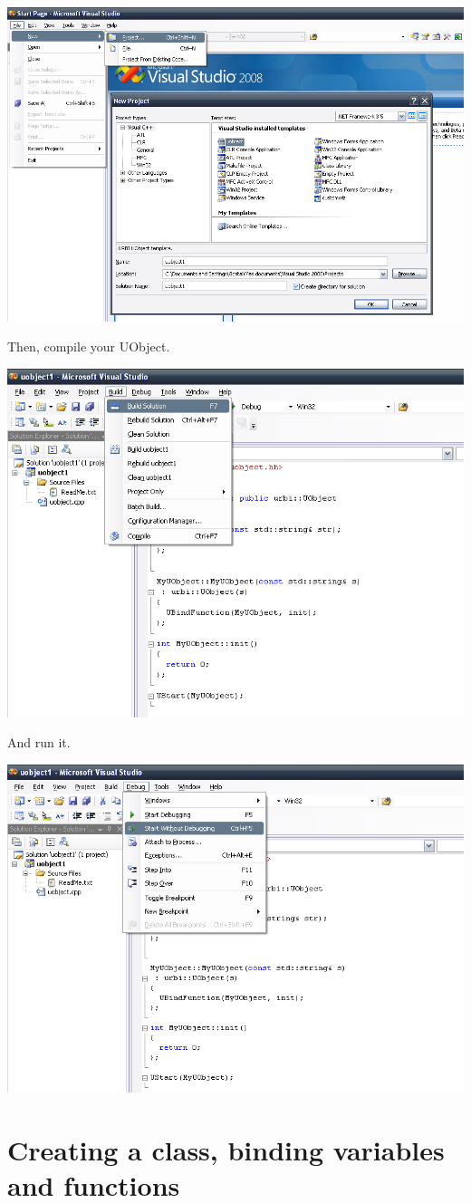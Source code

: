 \begin{center}
  \includegraphics[width=0.6\linewidth]{img/visual-wizard-1}
\end{center}

Then, compile your UObject.

\begin{center}
  \includegraphics[width=0.6\linewidth]{img/visual-wizard-2}
\end{center}

And run it.

\begin{center}
  \includegraphics[width=0.6\linewidth]{img/visual-wizard-3}
\end{center}


\section{Creating a class, binding variables and functions}
\label{sec:uob:api:bind}

